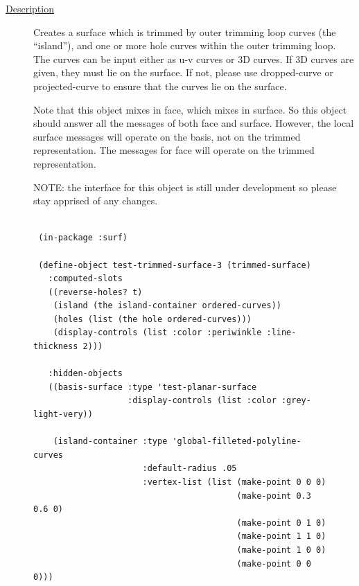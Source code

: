 \documentclass [11pt]{book}
\begin{document}
\begin{itemize}
\begin{description}
\item [
\underline{Description}]


Creates a surface which is trimmed by outer trimming loop curves (the ``island''), and one or more 
hole curves within the outer trimming loop. The curves can be input either as u-v curves or 3D curves.
If 3D curves are given, they must lie on the surface. If not, please use dropped-curve or projected-curve
to ensure that the curves lie on the surface.




Note that this object mixes in face, which mixes in surface. So this object should answer all the messages
of both face and surface. However, the local surface messages will operate on the basis, not on the trimmed 
representation. The messages for face will operate on the trimmed representation.






NOTE: the interface for this object is still under development so please stay apprised of any changes.





\end{description}




\begin{figure}
\begin{lrbox}{\boxedverb}
\begin{minipage}{\linewidth}
{\small

\begin{verbatim}

 (in-package :surf)
                  
 (define-object test-trimmed-surface-3 (trimmed-surface)
   :computed-slots
   ((reverse-holes? t)
    (island (the island-container ordered-curves))
    (holes (list (the hole ordered-curves)))
    (display-controls (list :color :periwinkle :line-thickness 2)))
  
   :hidden-objects
   ((basis-surface :type 'test-planar-surface
                   :display-controls (list :color :grey-light-very))
   
    (island-container :type 'global-filleted-polyline-curves
                      :default-radius .05
                      :vertex-list (list (make-point 0 0 0)
                                         (make-point 0.3 0.6 0)
                                         (make-point 0 1 0)
                                         (make-point 1 1 0)
                                         (make-point 1 0 0)
                                         (make-point 0 0 0)))
   

\end{verbatim}}
\end{minipage}
\end{lrbox}
\end{figure}
\end{itemize}
\end{document}
